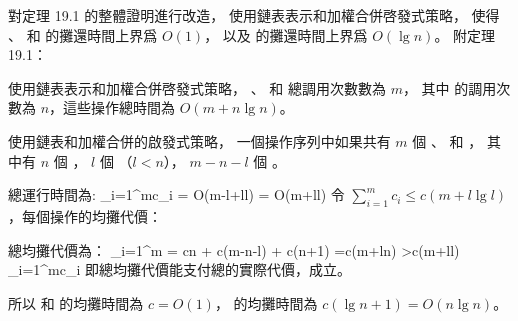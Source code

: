 \startEXERCISE
對定理 19.1 的整體證明進行改造，
使用鏈表表示和加權合併啓發式策略，
使得 、  和  的攤還時間上界爲 $O(1)$，
以及  的攤還時間上界爲 $O(\lg n)$。
附定理 19.1：

使用鏈表表示和加權合併啓發式策略，
、  和  總調用次數數為 $m$，
其中  的調用次數為 $n$，這些操作總時間為 $O(m+n\lg n)$。
\stopEXERCISE

\startANSWER
使用鏈表和加權合併的啟發式策略，
一個操作序列中如果共有 $m$ 個 、  和 ，
其中有 $n$ 個 ，
$l$ 個 （$l < n$），
$m-n-l$ 個 。

總運行時間為:
\startformula
\sum_{i=1}^{m}c_i = O(m-l+l\lg l) = O(m+l\lg l)
\stopformula
令 $\sum_{i=1}^{m}c_i\le c(m+l\lg l)$，每個操作的均攤代價：


總均攤代價為：
\startformula\startmathalignment
\NC \sum_{i=1}^{m} \NC = cn + c(m-n-l) + c(\lg n+1) \NR
\NC \NC =c(m+l\lg n) \NR
\NC \NC >c(m+l\lg l) \NR
\NC \NC \ge \sum_{i=1}^{m}c_i \NR
\stopmathalignment\stopformula
即總均攤代價能支付總的實際代價，成立。

所以  和  的均攤時間為 $c=O(1)$，
 的均攤時間為 $c(\lg n + 1) = O(n\lg n)$。
\stopANSWER
